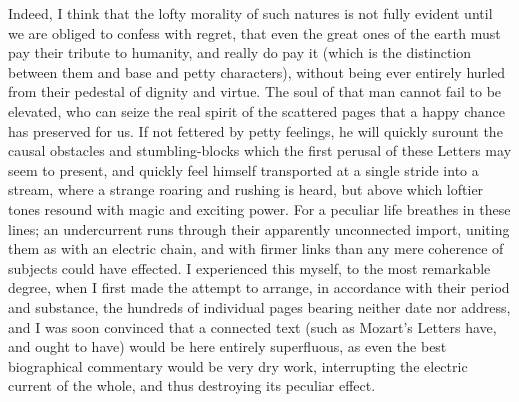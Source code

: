 \documentclass[12pt,oneside]{book}
\begin{document}
Indeed, I think that the lofty morality of such natures is not fully evident until we are obliged to confess with regret, that even the great ones of the earth must pay their tribute to humanity, and really do pay it (which is the distinction between them and base and petty characters), without being ever entirely hurled from their pedestal of dignity and virtue. The soul of that man cannot fail to be elevated, who can seize the real spirit of the scattered pages that a happy chance has preserved for us. If not fettered by petty feelings, he will quickly surount the causal obstacles and stumbling-blocks which the first perusal of these Letters may seem to present, and quickly feel himself transported at a single stride into a stream, where a strange roaring and rushing is heard, but above which loftier tones resound with magic and exciting power. For a peculiar life breathes in these lines; an undercurrent runs through their apparently unconnected import, uniting them as with an electric chain, and with firmer links than any mere coherence of subjects could have effected. I experienced this myself, to the most remarkable degree, when I first made the attempt to arrange, in accordance with their period and substance, the hundreds of individual pages bearing neither date nor address, and I was soon convinced that a connected text (such as Mozart's Letters have, and ought to have) would be here entirely superfluous, as even the best biographical commentary would be very dry work, interrupting the electric current of the whole, and thus destroying its peculiar effect. \par 
\end{document}
